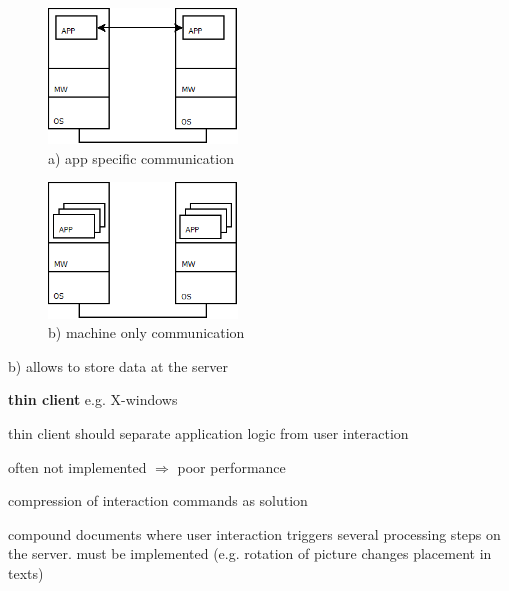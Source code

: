 \begin{minipage}{\linewidth}
      \centering
      \begin{minipage}{0.45\linewidth}
          \begin{figure}[H]
	           \includegraphics[width=190px]{gfx/clienta.png}
               \caption{a) app specific communication}
          \end{figure}
      \end{minipage}
      \hspace{0.05\linewidth}
      \begin{minipage}{0.45\linewidth}
          \begin{figure}[H]
        	\includegraphics[width=190px]{gfx/clientb.png}
            \caption{b) machine only communication}
          \end{figure}
      \end{minipage}
\end{minipage}

\begin{compactitem}
\item b) allows to store data at the server
\item \textbf{thin client} e.g. X-windows
\item thin client should separate application logic from user interaction
\item often not implemented $\Rightarrow$ poor performance
\item compression of interaction commands as solution
\item compound documents where user interaction triggers several processing steps on the server. must be implemented (e.g. rotation of picture changes placement in texts)
\end{compactitem}

